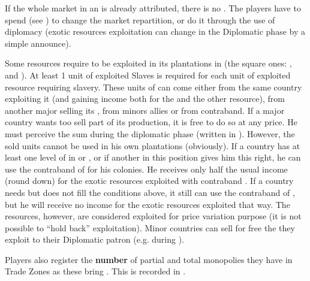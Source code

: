 \bparag If the whole market in an \Area is already attributed, there is no
. The players have to spend  (see ) to change the market
repartition, or do it through the use of diplomacy (exotic resources
exploitation can change in the Diplomatic phase by a simple announce).

\label{chIncomes:NeedSlaves}
Some resources require  to be exploited in its plantations
in  (the square ones: ,  and ). At least 1 unit of exploited Slaves is
required for each unit of exploited resource requiring slavery.
 These units of  can come either
from the same country exploiting it (and gaining income both for the
 and the other resource), from another major selling its
, from minors allies or from contraband.
 If a major country wants too sell part of
its  production, it is free to do so at any price. He must
perceive the sum during the diplomatic phase (written in
). However, the sold  units
cannot be used in his own plantations (obviously).
 If a country has at least one level of
\TradeFLEET in  or , or if another \MAJ in this
position gives him this right, he can use the contraband of 
for his colonies. He receives only half the usual income (round down)
for the exotic resources exploited with contraband .
 If a country needs  but
does not fill the conditions above, it still can use the contraband of
, but he will receive no income for the exotic resources
exploited that way. The resources, however, are considered exploited for
price variation purpose (it is not possible to ``hold back''
exploitation).
 Minor countries can sell for free the
 they exploit to their Diplomatic patron
(e.g.  during ).

\aparag Players also register the \textbf{number} of partial and total
monopolies they have in Trade Zones as these bring \VPs. This is
recorded in .

